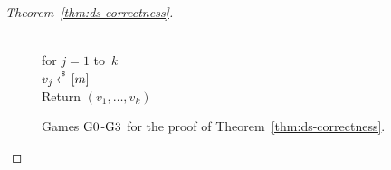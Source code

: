 \begin{proof}[Theorem~\ref{thm:ds-correctness}]
\begin{figure}[tp]
{{\medskip
{}\\
for $j = 1$ to~$k$\\
\nudge $v_j {\:\stackrel{{\scriptscriptstyle \hspace{0.2em}\$}} {\leftarrow}\:} [m]$\\
Return $\left(v_1,\ldots,v_k\right)$
}
}
\caption{Games $\text{G0}$-$\text{G3}$ for the
proof of Theorem~\ref{thm:ds-correctness}.}
\label{fig:ds-correctness-games}

\end{figure}

\begin{figure}
\centering
{}
\end{figure}
\end{proof}
